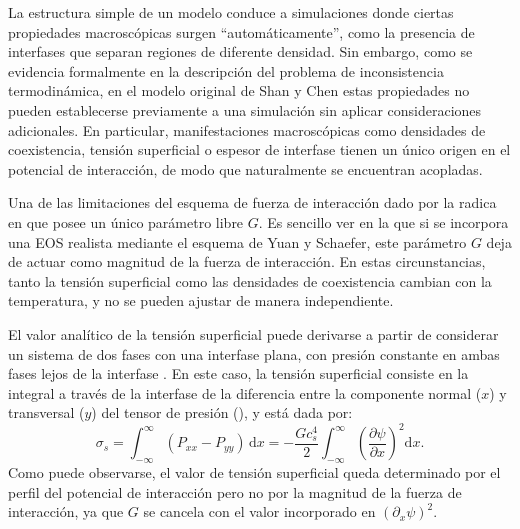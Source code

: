 La estructura simple de un modelo \pp{} conduce a simulaciones donde ciertas propiedades macrosc\'opicas surgen ``autom\'aticamente'', como la presencia de interfases que separan regiones de diferente densidad. Sin embargo, como se evidencia formalmente en la descripci\'on del problema de inconsistencia termodin\'amica, en el modelo original de Shan y Chen estas propiedades no pueden establecerse previamente a una simulaci\'on sin aplicar consideraciones adicionales. En particular, manifestaciones macrosc\'opicas como densidades de coexistencia, tensi\'on superficial o espesor de interfase tienen un \'unico origen en el potencial de interacci\'on, de modo que naturalmente se encuentran acopladas.

Una de las limitaciones del esquema de fuerza de interacci\'on dado por la  radica en que posee un \'unico par\'ametro libre $G$. Es sencillo ver en la  que si se incorpora una EOS realista mediante el esquema de Yuan y Schaefer, este par\'ametro $G$ deja de actuar como magnitud de la fuerza de interacci\'on. En estas circunstancias, tanto la tensi\'on superficial como las densidades de coexistencia cambian con la temperatura, y no se pueden ajustar de manera independiente. 

El valor anal\'itico de la tensi\'on superficial puede derivarse a partir de considerar un sistema de dos fases con una interfase plana, con presi\'on constante en ambas fases lejos de la interfase \cite{shan_simulation_1994}. En este caso, la tensi\'on superficial consiste en la integral a trav\'es de la interfase de la diferencia entre la componente normal ($x$) y transversal ($y$) del tensor de presi\'on (), y est\'a dada por:
\begin{equation}
	\sigma_s = \int_{-\infty}^{\infty} (P_{xx}-P_{yy}) \, \mbox{d}x
	         = -\dfrac{Gc_s^4}{2} \int_{-\infty}^{\infty} \left( \dfrac{\partial \psi}{\partial x} \right)^2 \mbox{d}x.
\end{equation}
Como puede observarse, el valor de tensi\'on superficial queda determinado por el perfil del potencial de interacci\'on pero no por la magnitud de la fuerza de interacci\'on, ya que $G$ se cancela con el valor incorporado en $(\partial_x \psi)^2$.

